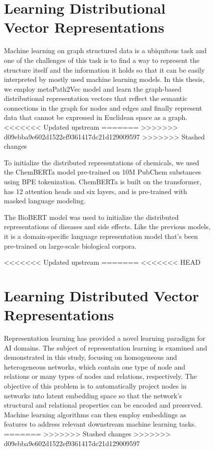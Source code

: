 \begin{figure}[h]
\section{Learning Distributional Vector Representations}
Machine learning on graph structured data is a ubiquitous task and one of the challenges of this task is to find a way to represent the structure itself and the information it holds so that it can be easily interpreted by mostly used machine learning models. In this thesis, we employ metaPath2Vec \cite{dong2017metapath2vec} model and learn the graph-based distributional representation vectors that reflect the semantic connections in the graph for nodes and edges and finally represent data that cannot be expressed in Euclidean space as a graph.
<<<<<<< Updated upstream
=======
>>>>>>> d09ebba9e602d1522ef9361417dc21d129009597
>>>>>>> Stashed changes



To initialize the distributed representations of chemicals, we used the ChemBERTa model pre-trained on 10M PubChem substances using BPE tokenization. ChemBERTa is built on the transformer, has 12 attention heads and six layers, and is pre-trained with masked language modeling.

The BioBERT model was used to initialize the distributed representations of diseases and side effects. Like the previous models, it is a domain-specific language representation model that's been pre-trained on large-scale biological corpora.

<<<<<<< Updated upstream
=======
<<<<<<< HEAD
\section{Learning Distributed Vector Representations}
Representation learning has provided a novel learning paradigm for AI domains. The subject of representation learning is examined and demonstrated in this study, focusing on homogeneous and heterogeneous networks, which contain one type of node and relations or many types of nodes and relations, respectively. The objective of this problem is to automatically project nodes in networks into latent embedding space so that the network's structural and relational properties can be encoded and preserved. Machine learning algorithms can then employ embeddings as features to address relevant downstream machine learning tasks. 
=======
>>>>>>> Stashed changes
>>>>>>> d09ebba9e602d1522ef9361417dc21d129009597


\end{figure}
